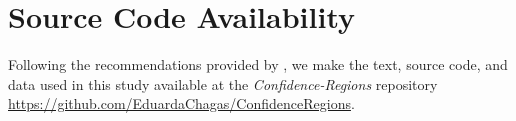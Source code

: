 \section{Source Code Availability}\label{Sec:code}

Following the recommendations provided by \cite{ABadgingSystemforReproducibilityandReplicabilityinRemoteSensingResearch}, we make the text, source code, and data used in this study available at the \textit{Confidence-Regions} repository \url{https://github.com/EduardaChagas/ConfidenceRegions}.



